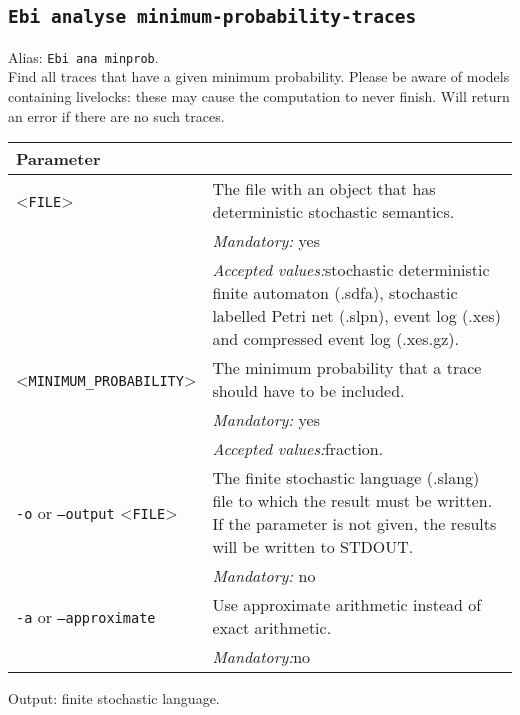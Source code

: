 {\subsection{\texttt{Ebi analyse minimum-probability-traces}}
Alias: \texttt{Ebi ana minprob}.\\
Find all traces that have a given minimum probability.
Please be aware of models containing livelocks: these may cause the computation to never finish.
Will return an error if there are no such traces.\\
\begin{tabularx}{\linewidth}{lX}
\toprule
Parameter \\\midrule
<\texttt{FILE}>&The file with an object that has deterministic stochastic semantics.\\
&\textit{Mandatory:} \quad yes\\
&\textit{Accepted values:}\quad stochastic deterministic finite automaton (.sdfa), stochastic labelled Petri net (.slpn), event log (.xes) and compressed event log (.xes.gz).\\
<\texttt{MINIMUM\_PROBABILITY}>&The minimum probability that a trace should have to be included.\\
&\textit{Mandatory:} \quad yes\\
&\textit{Accepted values:}\quad fraction.\\
\texttt{-o} or \texttt{--output} <\texttt{FILE}> &
The finite stochastic language (.slang) file to which the result must be written. If the parameter is not given, the results will be written to STDOUT.\\
&\textit{Mandatory:} \quad no\\
\texttt{-a} or \texttt{--approximate} & Use approximate arithmetic instead of exact arithmetic.\\
&\textit{Mandatory:}\quad no\\
\bottomrule
\end{tabularx}
Output: finite stochastic language.
}
